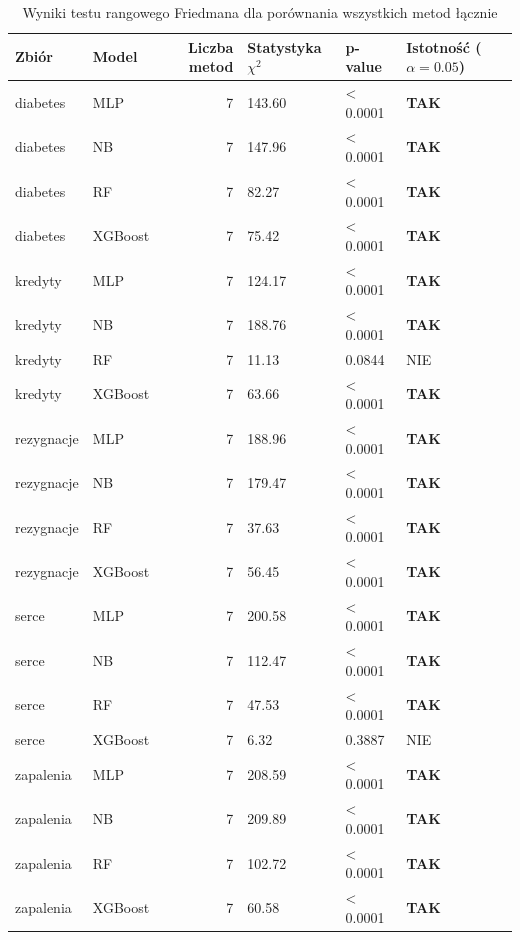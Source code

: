\begin{table}[htbp]
\caption{Wyniki testu rangowego Friedmana dla porównania wszystkich metod łącznie}
\label{tab:test_friedman}
\begin{tabular}{llrlll}
\toprule
Zbiór & Model & Liczba metod & Statystyka $\chi^2$ & p-value & Istotność ($\alpha=0.05$) \\
\midrule
diabetes & MLP & 7 & 143.60 & < 0.0001 & \textbf{TAK} \\
diabetes & NB & 7 & 147.96 & < 0.0001 & \textbf{TAK} \\
diabetes & RF & 7 & 82.27 & < 0.0001 & \textbf{TAK} \\
diabetes & XGBoost & 7 & 75.42 & < 0.0001 & \textbf{TAK} \\
kredyty & MLP & 7 & 124.17 & < 0.0001 & \textbf{TAK} \\
kredyty & NB & 7 & 188.76 & < 0.0001 & \textbf{TAK} \\
kredyty & RF & 7 & 11.13 & 0.0844 & NIE \\
kredyty & XGBoost & 7 & 63.66 & < 0.0001 & \textbf{TAK} \\
rezygnacje & MLP & 7 & 188.96 & < 0.0001 & \textbf{TAK} \\
rezygnacje & NB & 7 & 179.47 & < 0.0001 & \textbf{TAK} \\
rezygnacje & RF & 7 & 37.63 & < 0.0001 & \textbf{TAK} \\
rezygnacje & XGBoost & 7 & 56.45 & < 0.0001 & \textbf{TAK} \\
serce & MLP & 7 & 200.58 & < 0.0001 & \textbf{TAK} \\
serce & NB & 7 & 112.47 & < 0.0001 & \textbf{TAK} \\
serce & RF & 7 & 47.53 & < 0.0001 & \textbf{TAK} \\
serce & XGBoost & 7 & 6.32 & 0.3887 & NIE \\
zapalenia & MLP & 7 & 208.59 & < 0.0001 & \textbf{TAK} \\
zapalenia & NB & 7 & 209.89 & < 0.0001 & \textbf{TAK} \\
zapalenia & RF & 7 & 102.72 & < 0.0001 & \textbf{TAK} \\
zapalenia & XGBoost & 7 & 60.58 & < 0.0001 & \textbf{TAK} \\
\bottomrule
\end{tabular}
\end{table}
